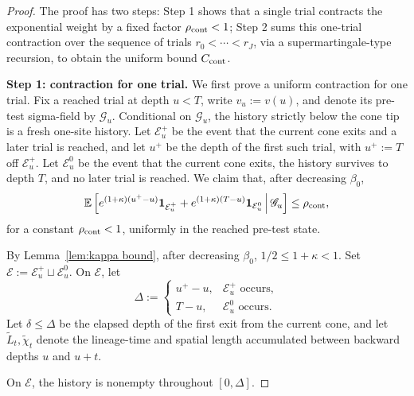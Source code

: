 \documentclass[letterpaper,11pt,reqno]{amsart}
\theoremstyle{definition}
\begin{document}
\begin{proof}
The proof has two steps: Step 1 shows that a single trial contracts the exponential weight by a
fixed factor \(\rho_{\rm cont}<1\); Step 2 sums this one-trial contraction over the sequence of
trials \(r_0<\cdots<r_J\), via a supermartingale-type recursion, to obtain the uniform bound
\(C_{\rm cont}\).

\smallskip
\noindent\textbf{Step 1: contraction for one trial.}
We first prove a uniform contraction for
one trial. Fix a reached trial at depth \(u<T\), write \(v_u:=v(u)\), and
denote its pre-test sigma-field by \(\mathscr G_u\). Conditional on
\(\mathscr G_u\), the history strictly below the cone tip is a fresh one-site
history.
%
Let \(\mathcal E_u^+\) be the event that the current cone exits and a later
trial is reached, and let \(u^+\) be the depth of the first such trial, with
\(u^+:=T\) off \(\mathcal E_u^+\). Let \(\mathcal E_u^0\) be the event that
the current cone exits, the history survives to depth \(T\), and no later
trial is reached. We claim that, after decreasing \(\beta_0\),
\begin{equation}\label{eq:cycle-contraction}
\mathbb E\left[
    e^{(1+\kappa)(u^+-u)}\mathbf 1_{\mathcal E_u^+}
    +e^{(1+\kappa)(T-u)}\mathbf 1_{\mathcal E_u^0}
    \,\middle|\,
    \mathscr G_u
\right]
\le \rho_{\rm cont},
\end{equation}
for a constant \(\rho_{\rm cont}<1\), uniformly in the reached pre-test state.

By Lemma~\ref{lem:kappa bound}, after decreasing \(\beta_0\), $1/2\leq 1+\kappa<1$. 
Set
\(\mathcal E:=\mathcal E_u^+\sqcup\mathcal E_u^0\). On \(\mathcal E\), let
\[
\Delta:=
\begin{cases}
u^+-u,&\mathcal E_u^+\text{ occurs},\\
T-u,&\mathcal E_u^0\text{ occurs}.
\end{cases}
\]
Let \(\delta\le\Delta\) be the elapsed depth of the first exit from the
current cone, and let \(\widetilde L_t,\widetilde\chi_t\) denote the lineage-time and spatial length accumulated between backward depths \(u\) and \(u+t\).






On \(\mathcal E\),
the history is nonempty throughout \([0,\Delta]\). 



\end{proof}
\end{document}
